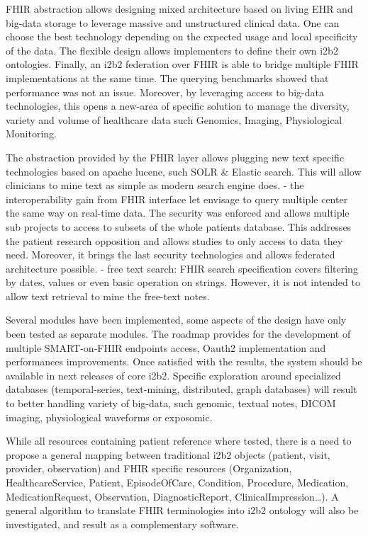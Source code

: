 \documentclass{amia}
\begin{document}
FHIR abstraction allows designing mixed architecture based on living EHR and big-data storage to leverage massive and unstructured clinical data. One can choose the best technology depending on the expected usage and local specificity of the data. The flexible design allows implementers to define their own i2b2 ontologies. Finally, an i2b2 federation over FHIR is able to bridge multiple FHIR implementations at the same time. The querying benchmarks showed that performance was not an issue. Moreover, by leveraging access to big-data technologies, this opens a new-area of specific solution to manage the diversity, variety and volume of healthcare data such Genomics, Imaging, Physiological Monitoring.

The abstraction provided by the FHIR layer allows plugging new text specific technologies based on apache lucene, such SOLR \& Elastic search. This will allow clinicians to mine text as simple as modern search engine does. - the interoperability gain from FHIR interface let envisage to query multiple center the same way on real-time data. The security was enforced and allows multiple sub projects to access to subsets of the whole patients database. This addresses the patient research opposition  and allows studies to only access to data they need. Moreover, it brings the last security technologies and allows federated architecture possible. - free text search: FHIR search specification covers filtering by dates, values or even basic operation on strings. However, it is not intended to allow text retrieval to mine the free-text notes.

Several modules have been implemented, some aspects of the design have only been tested as separate modules. The roadmap provides for the development of multiple SMART-on-FHIR endpoints access, Oauth2 implementation and performances improvements. Once satisfied with the results, the system should be available in next releases of core i2b2. Specific exploration around specialized databases (temporal-series, text-mining, distributed, graph databases) will result to better handling variety of big-data, such genomic\cite{ref18}, textual notes, DICOM imaging, physiological waveforms or exposomic.

While all resources containing patient reference where tested, there is a need to propose a general mapping between traditional i2b2 objects (patient, visit, provider, observation) and FHIR specific resources (Organization, HealthcareService, Patient, EpisodeOfCare, Condition, Procedure, Medication, MedicationRequest, Observation, DiagnosticReport, ClinicalImpression\ldots). A general algorithm to translate FHIR terminologies into i2b2 ontology will also be investigated, and result as a complementary software.
\end{document}
